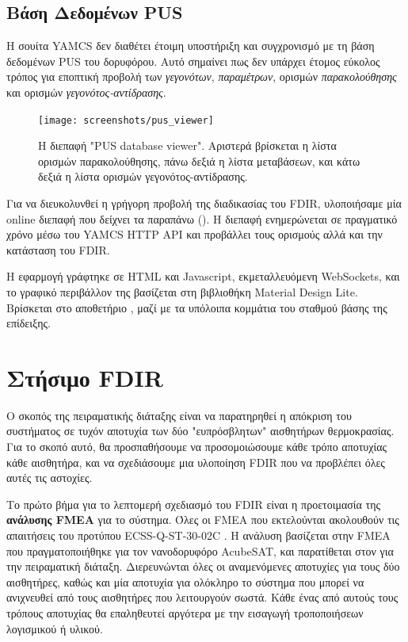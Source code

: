 \documentclass[a4paper,nobib]{tufte-book}
\begin{document}
\subsection{Βάση Δεδομένων \acs{PUS}}
\label{sec:pusinterface}

Η σουίτα \acs{YAMCS} δεν διαθέτει έτοιμη υποστήριξη και συγχρονισμό με τη βάση δεδομένων \acs{PUS} του δορυφόρου. Αυτό σημαίνει πως δεν υπάρχει έτομος εύκολος τρόπος για εποπτική προβολή των \emph{γεγονότων}, \emph{παραμέτρων}, ορισμών \emph{παρακολούθησης} και ορισμών \emph{γεγονότος-αντίδρασης}.

\begin{figure}[h]
	\texttt{[image: screenshots/pus\_viewer]}
	\caption[Η διεπαφή "PUS database viewer"]{Η διεπαφή "\acs{PUS} database viewer". Αριστερά βρίσκεται η λίστα ορισμών παρακολούθησης, πάνω δεξιά η λίστα μεταβάσεων, και κάτω δεξιά η λίστα ορισμών γεγονότος-αντίδρασης.}
	\label{fig:pusviewer}
\end{figure}

Για να διευκολυνθεί η γρήγορη προβολή της διαδικασίας του \acs{FDIR}, υλοποιήσαμε μία online διεπαφή που δείχνει τα παραπάνω (). Η διεπαφή ενημερώνεται σε πραγματικό χρόνο μέσω του \acs{YAMCS} \acs{HTTP} \acs{API} και προβάλλει τους ορισμούς αλλά και την κατάσταση του \acs{FDIR}.

Η εφαρμογή γράφτηκε σε HTML και Javascript, εκμεταλλευόμενη WebSockets, και το γραφικό περιβάλλον της βασίζεται στη βιβλιοθήκη Material Design Lite. Βρίσκεται στο αποθετήριο , μαζί με τα υπόλοιπα κομμάτια του σταθμού βάσης της επίδειξης.


\section{Στήσιμο \acs{FDIR}}

Ο σκοπός της πειραματικής διάταξης είναι να παρατηρηθεί η απόκριση του συστήματος σε τυχόν αποτυχία των δύο "ευπρόσβλητων" αισθητήρων θερμοκρασίας. Για το σκοπό αυτό, θα προσπαθήσουμε να προσομοιώσουμε κάθε τρόπο αποτυχίας κάθε αισθητήρα, και να σχεδιάσουμε μια υλοποίηση \ac{FDIR} που να προβλέπει όλες αυτές τις αστοχίες.

Το πρώτο βήμα για το λεπτομερή σχεδιασμό του \ac{FDIR} είναι η προετοιμασία της \textbf{ανάλυσης FMEA} για το σύστημα. Όλες οι \ac{FMEA} που εκτελούνται ακολουθούν τις απαιτήσεις του προτύπου ECSS-Q-ST-30-02C \autocite{ECSS-Q-ST-30-02C}. Η ανάλυση βασίζεται στην \ac{FMEA} που πραγματοποιήθηκε για τον νανοδορυφόρο AcubeSAT,\autocite{retselis_acubesat_fmea_2020} και παρατίθεται στον  για την πειραματική διάταξη. Διερευνώνται όλες οι αναμενόμενες αποτυχίες για τους δύο αισθητήρες, καθώς και μία αποτυχία για ολόκληρο το σύστημα που μπορεί να ανιχνευθεί από τους αισθητήρες που λειτουργούν σωστά. Κάθε ένας από αυτούς τους τρόπους αποτυχίας θα επαληθευτεί αργότερα με την εισαγωγή τροποποιήσεων λογισμικού ή υλικού.
\end{document}
